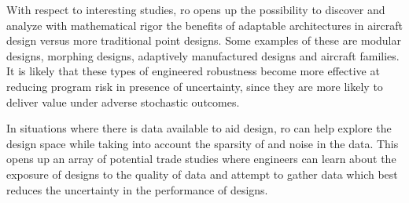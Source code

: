 With respect to interesting studies, \gls{ro} opens up the possibility to discover and analyze
with mathematical rigor the benefits
of adaptable architectures in aircraft design versus more traditional point designs.
Some examples of these are modular designs, morphing designs,
adaptively manufactured designs and aircraft families. It is likely that these types of engineered
robustness become more effective at reducing program risk
in presence of uncertainty, since they are more likely
to deliver value under adverse stochastic outcomes.

In situations where there is data available to aid design, \gls{ro} can help explore
the design space while taking into account the sparsity of and noise in the data.
This opens up an array of potential trade studies where engineers can learn about
the exposure of designs to the quality of data and attempt to gather
data which best reduces the uncertainty in the performance of designs.
